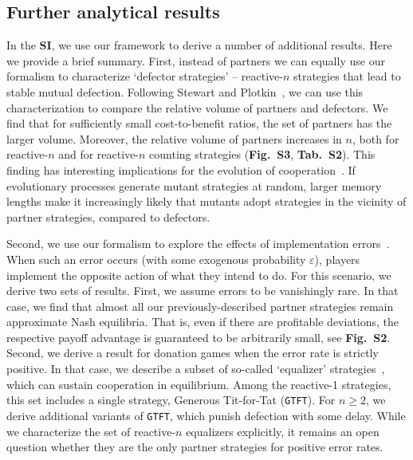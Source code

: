 \documentclass[9pt,twocolumn,twoside]{pnas-new}
\def\gtft{\texttt{GTFT}}
\def\SI{\textbf{SI}}
\begin{document}

\subsection*{Further analytical results}
In the \SI{}, we use our framework to derive a number of additional results. Here we provide a brief summary. 
First, instead of partners we can equally use our formalism to characterize `defector strategies' -- reactive-$n$ strategies that lead to stable mutual defection. 
Following Stewart and Plotkin~\citep{stewart:scientific:2016}, we can use this characterization to compare the relative volume of partners and defectors. 
We find that for sufficiently small cost-to-benefit ratios, the set of partners has the larger volume. 
Moreover, the relative volume of partners increases in $n$, both for reactive-$n$ and for reactive-$n$ counting strategies (\textbf{Fig.~S3}, \textbf{Tab.~S2}). 
This finding has interesting implications for the evolution of cooperation~\citep{stewart:pnas:2014,stewart:scientific:2016}. 
If evolutionary processes generate mutant strategies at random, larger memory lengths make it increasingly likely that mutants adopt strategies in the vicinity of partner strategies, compared to defectors.  

Second, we use our formalism to explore the effects of implementation errors~\citep{boyd:JTB:1989}. 
When such an error occurs (with some exogenous probability $\varepsilon$), players implement the opposite action of what they intend to do. 
For this scenario, we derive two sets of results. 
First, we assume errors to be vanishingly rare. 
In that case, we find that almost all our previously-described partner strategies remain approximate Nash equilibria. 
That is, even if there are profitable deviations, the respective payoff advantage is guaranteed to be arbitrarily small, see \textbf{Fig.~S2}. 
Second, we derive a result for donation games when the error rate is strictly positive. 
In that case, we describe a subset of so-called `equalizer' strategies~\cite{boerlijst:AMM:1997}, which can sustain cooperation in equilibrium. 
Among the reactive-1 strategies, this set includes a single strategy, Generous Tit-for-Tat (\gtft). 
For $n\!\ge\!2$, we derive additional variants of \gtft{}, which punish defection with some delay. 
While we characterize the set of reactive-$n$ equalizers explicitly, it remains an open question whether they are the only partner strategies for positive error rates. 
\end{document}
